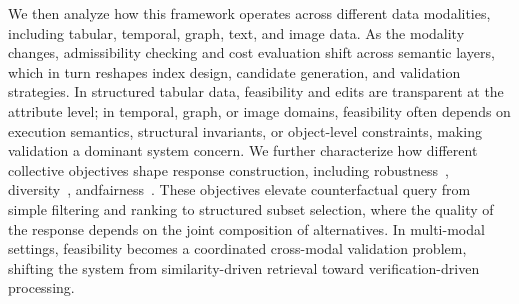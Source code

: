 We then analyze how this framework operates across different data modalities, including tabular, temporal, graph, text, and image data. As the modality changes, admissibility checking and cost evaluation shift across semantic layers, which in turn reshapes index design, candidate generation, and validation strategies. In structured tabular data, feasibility and edits are transparent at the attribute level; in temporal, graph, or image domains, feasibility often depends on execution semantics, structural invariants, or object-level constraints, making validation a dominant system concern. We further characterize how different collective objectives shape response construction, including robustness~\cite{guyomard2023generating}, diversity~\cite{laugel2023achieving}, andfairness~\cite{kusner2017counterfactual}. These objectives elevate counterfactual 
query from simple filtering and ranking to structured subset selection, where the quality of the response depends on the joint composition of alternatives. In multi-modal settings, feasibility becomes a coordinated cross-modal validation problem, shifting the system from similarity-driven retrieval toward verification-driven processing.




